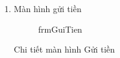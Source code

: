 \documentclass{article}
\begin{document}
\begin{enumerate}
\begin{enumerate}
					\newpage
					
					\item Màn hình gửi tiền
					
					
						\begin{figure}[!h]
							\setlength\fboxsep{1pt}
							\setlength\fboxrule{1pt}
							\caption{frmGuiTien}
							\label{fig:frmGuiTien}
						\end{figure}
						
						
						Chi tiết màn hình Gửi tiền
						
						\begin{tabular}{|c|c|c| p{5cm}|}
							

\end{tabular}
\end{enumerate}
\end{enumerate}
\end{document}
